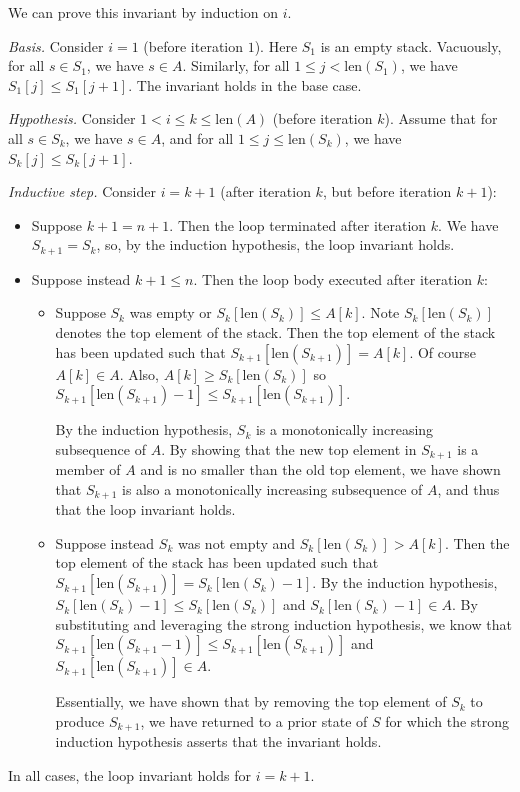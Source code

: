 \begin{enumerate}
\begin{solution}
We can prove this invariant by induction on $i$.

\textit{Basis. }Consider $i=1$ (before iteration $1$). Here $S_1$ is an empty stack. Vacuously, for all $s\in S_1$, we have $s\in A$. Similarly, for all $1\leq j<\text{len}(S_1)$, we have $S_1[j]\leq S_1[j+1]$. The invariant holds in the base case.

\textit{Hypothesis. }Consider $1<i\leq k\leq\text{len}(A)$ (before iteration $k$). Assume that for all $s\in S_k$, we have $s\in A$, and for all $1\leq j\leq\text{len}(S_k)$, we have $S_k[j]\leq S_k[j+1]$.

\textit{Inductive step. }Consider $i=k+1$ (after iteration $k$, but before iteration $k+1$):
\begin{itemize}
\item Suppose $k+1=n+1$. Then the loop terminated after iteration $k$. We have $S_{k+1}=S_k$, so, by the induction hypothesis, the loop invariant holds.
\item Suppose instead $k+1\leq n$. Then the loop body executed after iteration $k$:
\begin{itemize}
\item Suppose $S_k$ was empty or $S_k[\text{len}(S_k)]\leq A[k]$. Note $S_k[\text{len}(S_k)]$ denotes the top element of the stack. Then the top element of the stack has been updated such that $S_{k+1}[\text{len}(S_{k+1})]=A[k]$. Of course $A[k]\in A$. Also, $A[k]\geq S_k[\text{len}(S_k)]$ so $S_{k+1}[\text{len}(S_{k+1})-1]\leq S_{k+1}[\text{len}(S_{k+1})]$. 

By the induction hypothesis, $S_k$ is a monotonically increasing subsequence of $A$. By showing that the new top element in $S_{k+1}$ is a member of $A$ and is no smaller than the old top element, we have shown that $S_{k+1}$ is also a monotonically increasing subsequence of $A$, and thus that the loop invariant holds.
\item Suppose instead $S_k$ was not empty and $S_k[\text{len}(S_k)]>A[k]$. Then the top element of the stack has been updated such that $S_{k+1}[\text{len}(S_{k+1})]=S_k[\text{len}(S_k)-1]$. By the induction hypothesis, $S_k[\text{len}(S_k)-1]\leq S_k[\text{len}(S_k)]$ and $S_k[\text{len}(S_k)-1]\in A$. By substituting and leveraging the strong induction hypothesis, we know that $S_{k+1}[\text{len}(S_{k+1}-1)]\leq S_{k+1}[\text{len}(S_{k+1})]$ and $S_{k+1}[\text{len}(S_{k+1})]\in A$.

Essentially, we have shown that by removing the top element of $S_k$ to produce $S_{k+1}$, we have returned to a prior state of $S$ for which the strong induction hypothesis asserts that the invariant holds.
\end{itemize}
\end{itemize}
In all cases, the loop invariant holds for $i=k+1$.


\end{solution}
\end{enumerate}
